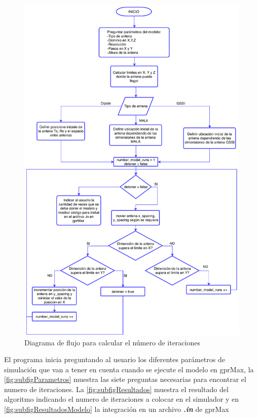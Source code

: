 \begin{figure}[H]
\centering
\includegraphics[height=\textheight-4.5cm,keepaspectratio]{chapter1/images/diagrama_flujo_calcular_iteraciones.pdf}
\caption{Diagrama de flujo para calcular el número de iteraciones}
\label{fig:FlowDiag_calc_iter}
\end{figure}

El programa inicia preguntando al  usuario los diferentes parámetros de simulación que van a tener en cuenta cuando se ejecute el modelo en gprMax, la \figurename{ \ref{fig:subfigParametros}} muestra las siete preguntas necesarias para encontrar el numero de iteraciones.  La  \figurename{ \ref{fig:subfigResultados}}  muestra el resultado del algoritmo indicando el numero de iteraciones a colocar en el simulador y en  \ref{fig:subfigResultadosModelo} la integración en un archivo \textbf{\textit{.in}} de gprMax



